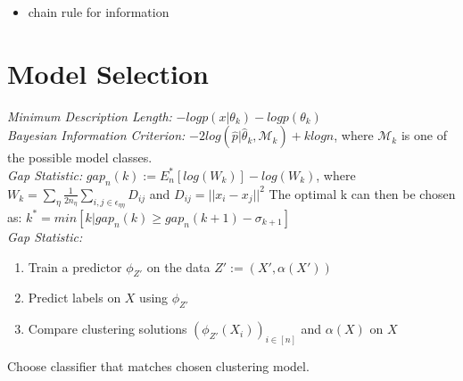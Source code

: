 \documentclass[9pt,parskip]{scrartcl}
\begin{document}
\begin{multicols*}{4}
\vspace{5cm}
\begin{itemize}
	\item chain rule for information
\end{itemize}
\section*{Model Selection}
\textit{Minimum Description Length: } $-log p (x|\theta_k) - log p(\theta_k)$ \\

\textit{Bayesian Information Criterion:} $-2 log (\hat p | \hat \theta_k, \mathcal{M}_k)  + k log n$, where $\mathcal{M}_k$ is one of the possible model classes. \\
\textit{Gap Statistic:} $gap_n(k) := E_n^*[log(W_k)] - log(W_k)$, where $W_k = \sum_{\eta}\frac{1}{2n_{\eta}} \sum_{i,j \in \epsilon_{\eta \eta}} D_{ij}$ and $D_{ij} = ||x_i -x_j||^2$
The optimal k can then be chosen as: $k^* = min[k|gap_n(k) \geq gap_n(k+1) - \sigma_{k+1}]$ \\

\textit{Gap Statistic:}
\begin{enumerate}
    \item Train a predictor $\phi_{Z'}$ on the data $Z' := (X', \alpha(X'))$
    \item Predict labels on $X$ using $\phi_{Z'}$
    \item Compare clustering solutions $(\phi_{Z'}(X_i))_{i \in [n]}$ and $\alpha(X)$ on $X$
\end{enumerate}

Choose classifier that matches chosen clustering model. 

\end{multicols*}
\end{document}
